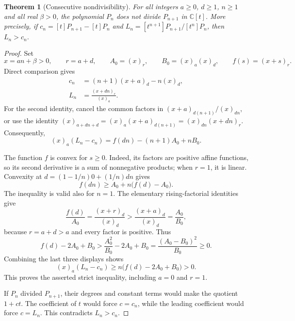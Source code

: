 \documentclass[11pt]{article}
\newtheorem{theorem}{Theorem}
\theoremstyle{remark}
\newcommand{\C}{\mathbb C}
\begin{document}
\begin{theorem}[Consecutive nondivisibility]\label{thm:nondivisibility}
For all integers $a\ge0$, $d\ge1$, $n\ge1$ and all real $\beta>0$,
the polynomial $P_n$ does not divide $P_{n+1}$ in $\C[t]$.
More precisely, if $c_n=[t]P_{n+1}-[t]P_n$ and
$L_n=[t^{n+1}]P_{n+1}/[t^n]P_n$, then $L_n>c_n$.
\end{theorem}
\begin{proof}
Set
\[
 x=an+\beta>0,\qquad r=a+d,\qquad
 A_0=(x)_r,\qquad B_0=(x)_a(x)_d,\qquad f(s)=(x+s)_r .
\]
Direct comparison gives
\begin{align}
 c_n&=(n+1)(x+a)_d-n(x)_d,\label{eq:first-difference}\\
 L_n&=\frac{(x+dn)_r}{(x)_a}.\label{eq:leading-ratio}
\end{align}
For the second identity, cancel the common factors in
$(x+a)_{d(n+1)}/(x)_{dn}$, or use the identity
$(x)_{a+dn+d}=(x)_a(x+a)_{d(n+1)}=(x)_{dn}(x+dn)_r$.
Consequently,
\begin{equation}\label{eq:numerator}
 (x)_a(L_n-c_n)=f(dn)-(n+1)A_0+nB_0.
\end{equation}

The function $f$ is convex for $s\ge0$. Indeed, its factors are positive
affine functions, so its second derivative is a sum of nonnegative
products; when $r=1$, it is linear. Convexity at
$d=(1-1/n)0+(1/n)dn$ gives
\[
 f(dn)\ge A_0+n\bigl(f(d)-A_0\bigr).
\]
The inequality is valid also for $n=1$.
The elementary rising-factorial identities give
\[
 \frac{f(d)}{A_0}=\frac{(x+r)_d}{(x)_d}
       >\frac{(x+a)_d}{(x)_d}=\frac{A_0}{B_0},
\]
because $r=a+d>a$ and every factor is positive.
Thus
\begin{equation}\label{eq:strict-core}
 f(d)-2A_0+B_0
 >\frac{A_0^2}{B_0}-2A_0+B_0
 =\frac{(A_0-B_0)^2}{B_0}\ge0.
\end{equation}
Combining the last three displays shows
\[
 (x)_a(L_n-c_n)\ge n\bigl(f(d)-2A_0+B_0\bigr)>0.
\]
This proves the asserted strict inequality, including $a=0$ and $r=1$.

If $P_n$ divided $P_{n+1}$, their degrees and constant terms would make
the quotient $1+ct$. The coefficient of $t$ would force $c=c_n$,
while the leading coefficient would force $c=L_n$. This contradicts
$L_n>c_n$.
\end{proof}
\end{document}
